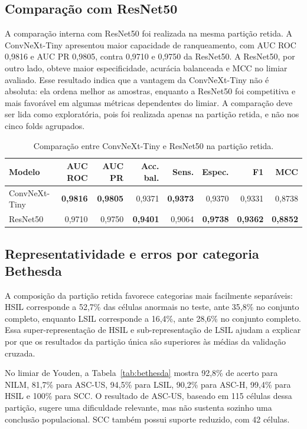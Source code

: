 \subsection{Comparação com ResNet50}

A comparação interna com ResNet50 foi realizada na mesma partição retida. A
ConvNeXt-Tiny apresentou maior capacidade de ranqueamento, com AUC ROC 0,9816 e
AUC PR 0,9805, contra 0,9710 e 0,9750 da ResNet50. A ResNet50, por outro lado,
obteve maior especificidade, acurácia balanceada e MCC no limiar avaliado. Esse
resultado indica que a vantagem da ConvNeXt-Tiny não é absoluta: ela ordena
melhor as amostras, enquanto a ResNet50 foi competitiva e mais favorável em
algumas métricas dependentes do limiar. A comparação deve ser lida como
exploratória, pois foi realizada apenas na partição retida, e não nos cinco
folds agrupados.

\begin{table}[ht]
\centering
\caption{Comparação entre ConvNeXt-Tiny e ResNet50 na partição retida.}
\label{tab:baseline}
\kariellytablefont
\kariellytablecols
\begin{tabular}{lrrrrrrr}
\toprule
Modelo & AUC ROC & AUC PR & Acc. bal. & Sens. & Espec. & F1 & MCC \\
\midrule
ConvNeXt-Tiny & \textbf{0,9816} & \textbf{0,9805} & 0,9371 & \textbf{0,9373} &
0,9370 & 0,9331 & 0,8738 \\
ResNet50 & 0,9710 & 0,9750 & \textbf{0,9401} & 0,9064 & \textbf{0,9738} &
\textbf{0,9362} & \textbf{0,8852} \\
\bottomrule
\end{tabular}
\end{table}

\subsection{Representatividade e erros por categoria Bethesda}

A composição da partição retida favorece categorias mais facilmente separáveis:
HSIL corresponde a 52,7\% das células anormais no teste, ante 35,8\% no
conjunto completo, enquanto LSIL corresponde a 16,4\%, ante 28,6\% no conjunto
completo. Essa super-representação de HSIL e sub-representação de LSIL ajudam a
explicar por que os resultados da partição única são superiores às médias da
validação cruzada.

No limiar de Youden, a Tabela~\ref{tab:bethesda} mostra 92,8\% de acerto para
NILM, 81,7\% para ASC-US, 94,5\% para LSIL, 90,2\% para ASC-H, 99,4\% para HSIL
e 100\% para SCC. O resultado de ASC-US, baseado em 115 células dessa partição,
sugere uma dificuldade relevante, mas não sustenta sozinho uma conclusão
populacional. SCC também possui suporte reduzido, com 42 células.


